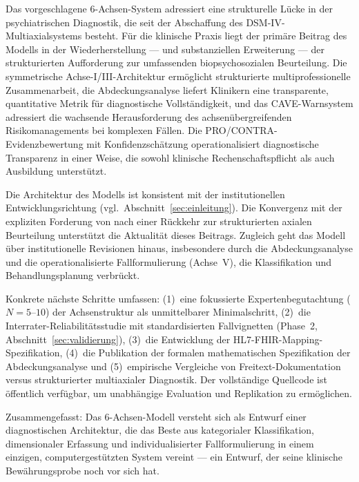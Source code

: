 \documentclass[11pt,a4paper]{article}
\begin{document}
Das vorgeschlagene 6-Achsen-System adressiert eine strukturelle L\"ucke in der psychiatrischen Diagnostik, die seit der Abschaffung des DSM-IV-Multiaxialsystems besteht. F\"ur die klinische Praxis liegt der prim\"are Beitrag des Modells in der Wiederherstellung --- und substanziellen Erweiterung --- der strukturierten Aufforderung zur umfassenden biopsychosozialen Beurteilung. Die symmetrische Achse-I/III-Architektur erm\"oglicht strukturierte multiprofessionelle Zusammenarbeit, die Abdeckungsanalyse liefert Klinikern eine transparente, quantitative Metrik f\"ur diagnostische Vollst\"andigkeit, und das CAVE-Warnsystem adressiert die wachsende Herausforderung des achsen\"ubergreifenden Risikomanagements bei komplexen F\"allen. Die PRO/CONTRA-Evidenzbewertung mit Konfidenzsch\"atzung operationalisiert diagnostische Transparenz in einer Weise, die sowohl klinische Rechenschaftspflicht als auch Ausbildung unterst\"utzt.

Die Architektur des Modells ist konsistent mit der institutionellen Entwicklungsrichtung (vgl.\ Abschnitt~\ref{sec:einleitung}). Die Konvergenz mit der expliziten Forderung von \citet{ErlichFirst2025} nach einer R\"uckkehr zur strukturierten axialen Beurteilung unterst\"utzt die Aktualit\"at dieses Beitrags. Zugleich geht das Modell \"uber institutionelle Revisionen hinaus, insbesondere durch die Abdeckungsanalyse und die operationalisierte Fallformulierung (Achse~V), die Klassifikation und Behandlungsplanung verbr\"uckt.

Konkrete n\"achste Schritte umfassen: (1)~eine fokussierte Expertenbegutachtung ($N = 5$--$10$) der Achsenstruktur als unmittelbarer Minimalschritt, (2)~die Interrater-Reliabilit\"atsstudie mit standardisierten Fallvignetten (Phase~2, Abschnitt~\ref{sec:validierung}), (3)~die Entwicklung der HL7-FHIR-Mapping-Spezifikation, (4)~die Publikation der formalen mathematischen Spezifikation der Abdeckungsanalyse und (5)~empirische Vergleiche von Freitext-Dokumentation versus strukturierter multiaxialer Diagnostik. Der vollst\"andige Quellcode ist \"offentlich verf\"ugbar, um unabh\"angige Evaluation und Replikation zu erm\"oglichen.

Zusammengefasst: Das 6-Achsen-Modell versteht sich als Entwurf einer diagnostischen Architektur, die das Beste aus kategorialer Klassifikation, dimensionaler Erfassung und individualisierter Fallformulierung in einem einzigen, computergest\"utzten System vereint --- ein Entwurf, der seine klinische Bew\"ahrungsprobe noch vor sich hat.
\end{document}
